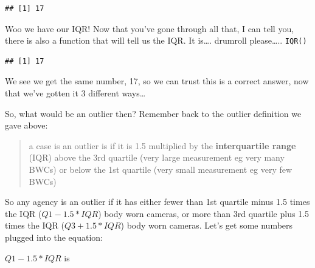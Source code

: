 \documentclass[
]{book}
\newenvironment{Shaded}{\begin{snugshade}}{\end{snugshade}}
\newcommand{\AttributeTok}[1]{\textcolor[rgb]{0.77,0.63,0.00}{#1}}
\newcommand{\ConstantTok}[1]{\textcolor[rgb]{0.00,0.00,0.00}{#1}}
\newcommand{\DecValTok}[1]{\textcolor[rgb]{0.00,0.00,0.81}{#1}}
\newcommand{\FloatTok}[1]{\textcolor[rgb]{0.00,0.00,0.81}{#1}}
\newcommand{\FunctionTok}[1]{\textcolor[rgb]{0.00,0.00,0.00}{#1}}
\newcommand{\NormalTok}[1]{#1}
\newcommand{\SpecialCharTok}[1]{\textcolor[rgb]{0.00,0.00,0.00}{#1}}
\begin{document}
\begin{verbatim}
## [1] 17
\end{verbatim}

Woo we have our IQR! Now that you've gone through all that, I can tell you, there is also a function that will tell us the IQR. It is\ldots. drumroll please\ldots.. \texttt{IQR()}

\begin{Shaded}
\end{Shaded}

\begin{verbatim}
## [1] 17
\end{verbatim}

We see we get the same number, 17, so we can trust this is a correct answer, now that we've gotten it 3 different ways\ldots{}

So, what would be an outlier then? Remember back to the outlier definition we gave above:

\begin{quote}
a case is an outlier is if it is 1.5 multiplied by the \textbf{interquartile range} (IQR) above the 3rd quartile (very large measurement eg very many BWCs) or below the 1st quartile (very small measurement eg very few BWCs)
\end{quote}

So any agency is an outlier if it has either fewer than 1st quartile minus 1.5 times the IQR (\(Q1 - 1.5*IQR\)) body worn cameras, or more than 3rd quartile plus 1.5 times the IQR (\(Q3 + 1.5*IQR\)) body worn cameras. Let's get some numbers plugged into the equation:

\(Q1 - 1.5*IQR\) is

\begin{Shaded}
\end{Shaded}
\end{document}
